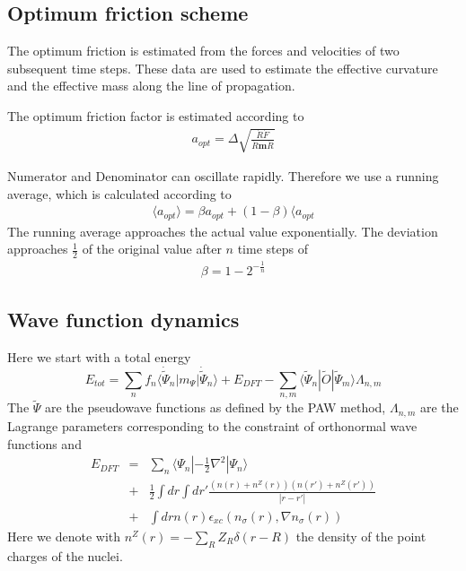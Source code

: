 \documentclass[final,12pt,makeidx,DIV=calc]{article}
\begin{document}
{{{%
\subsection{Optimum friction scheme}
\label{sec:optfric}
The optimum friction is estimated from the forces and velocities of
two subsequent time steps. These data are used to estimate the
effective curvature and the effective mass along the line of
propagation.

The optimum friction factor is estimated according to
\begin{eqnarray*}
a_{opt}=\Delta\sqrt{\frac{\dot{R}\dot{F}}{\dot{R}\mathbf{m}\dot{R}}}
\end{eqnarray*}

Numerator and Denominator can oscillate rapidly. Therefore we use a
running average, which is calculated according to
\begin{eqnarray*}
\langle a_{opt}\rangle=\beta a_{opt}+(1-\beta)\langle a_{opt}
\end{eqnarray*}
The running average approaches the actual value exponentially. The
deviation approaches $\frac{1}{2}$ of the original value after $n$
time steps of
\begin{eqnarray*}
\beta=1-2^{-\frac{1}{n}}
\end{eqnarray*}


\subsection{Wave function dynamics}
Here we start with a total energy
\begin{equation}
E_{tot}=\sum_n f_n\langle\dot{\tilde\Psi}_n|m_\Psi|\dot{\tilde\Psi}_n\rangle+E_{DFT}
-\sum_{n,m} \langle\tilde\Psi_n|\tilde{O}|\tilde\Psi_m\rangle\Lambda_{n,m}
\end{equation}
The $\tilde\Psi$ are the pseudowave functions as defined by the PAW
method, $\Lambda_{n,m}$ are the Lagrange parameters corresponding to
the constraint of orthonormal wave functions and 
\begin{eqnarray*}
E_{DFT}&=&\sum_n\langle\Psi_n|-\frac{1}{2}\nabla^2|\Psi_n\rangle
\\
&+&\frac{1}{2}\int dr \int dr' \frac{(n(r)+n^Z(r))(n(r')+n^Z(r'))}{|r-r'|}
\\
&+&\int dr n(r) \epsilon_{xc}(n_\sigma(r),\nabla n_\sigma(r))
\end{eqnarray*}
Here we denote with $n^Z(r)=-\sum_R Z_R\delta(r-R)$ the density of the
point charges of the nuclei. 

}}}
\end{document}
